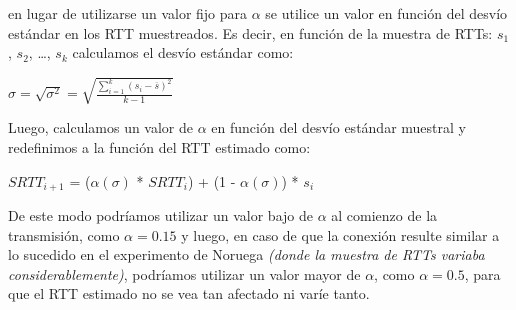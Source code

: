 en lugar de utilizarse un valor fijo para $\alpha$ se utilice un valor en función del desvío estándar en los RTT muestreados. Es decir, en función de la muestra de RTTs: $s_1$, $s_2$, \ldots , $s_k$ calculamos el desvío estándar como:
\begin{center}
  $\sigma = \sqrt{\sigma^2} = \sqrt{\frac{\sum_{i=1}^{k} {(s_i - \overline{s})}^2}{k - 1}}$
\end{center}

Luego, calculamos un valor de $\alpha$ en función del desvío estándar muestral y redefinimos a la función del RTT estimado como:
\begin{center}
  $SRTT_{i+1}$ = ($\alpha(\sigma)$ * $SRTT_i$) + (1 - $\alpha(\sigma)$) * $s_i$
\end{center}

De este modo podríamos utilizar un valor bajo de $\alpha$ al comienzo de la transmisión, como $\alpha = 0.15$ y luego, en caso de que la conexión resulte similar a lo sucedido en el experimento de Noruega \textit{(donde la muestra de RTTs variaba considerablemente)}, podríamos utilizar un valor mayor de $\alpha$, como $\alpha = 0.5$, para que el RTT estimado no se vea tan afectado ni varíe tanto.
